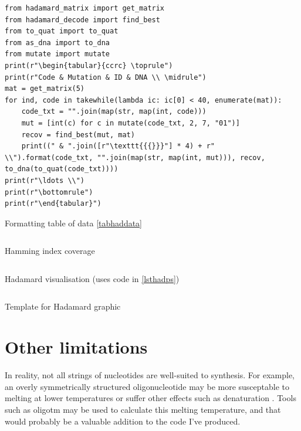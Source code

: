 \documentclass[a4paper,11pt]{article}
\newenvironment{longlisting}
{\addvspace{\baselineskip}\captionsetup{type=listing}}
{\addvspace{\baselineskip}}
\begin{document}
\begin{longlisting}
\begin{verbatim}
from hadamard_matrix import get_matrix
from hadamard_decode import find_best
from to_quat import to_quat
from as_dna import to_dna
from mutate import mutate
print(r"\begin{tabular}{ccrc} \toprule")
print(r"Code & Mutation & ID & DNA \\ \midrule")
mat = get_matrix(5)
for ind, code in takewhile(lambda ic: ic[0] < 40, enumerate(mat)):
    code_txt = "".join(map(str, map(int, code)))
    mut = [int(c) for c in mutate(code_txt, 2, 7, "01")]
    recov = find_best(mut, mat)
    print((" & ".join([r"\texttt{{{}}}"] * 4) + r" \\").format(code_txt, "".join(map(str, map(int, mut))), recov, to_dna(to_quat(code_txt))))
print(r"\ldots \\")
print(r"\bottomrule")
print(r"\end{tabular}")
\end{verbatim}
\caption{Formatting table of data \ref{tabhaddata}}\label{lsthaddatatab}
\end{longlisting}

\begin{longlisting}
\inputminted{postscript}{../psfiles/hamming_visualisation.ps}
\caption{Hamming index coverage}\label{lsthamps}
\end{longlisting}

\begin{longlisting}
\inputminted{python}{../src/generate_ham_vis.py}
\caption{Hadamard visualisation (uses code in \ref{lsthadps})}\label{lsthadpy}
\end{longlisting}

\begin{longlisting}
\inputminted{postscript}{../src/hadamard_template.ps}
\caption{Template for Hadamard graphic}\label{lsthadps}
\end{longlisting}

    \section{Other limitations}

    In reality, not all strings of nucleotides are well-suited to synthesis. For
    example, an overly symmetrically structured oligonucleotide may be more
    susceptable to melting at lower temperatures
    \cite{MeltingCurve1979Azbel,MeltingPoint1980Pitkin} or suffer other effects
    such as denaturation \cite{Denaturation2010Reisner}. Tools such as oligotm
    \cite{oligotm} may be used to calculate this melting temperature, and that
    would probably be a valuable addition to the code I've produced.
\end{document}
